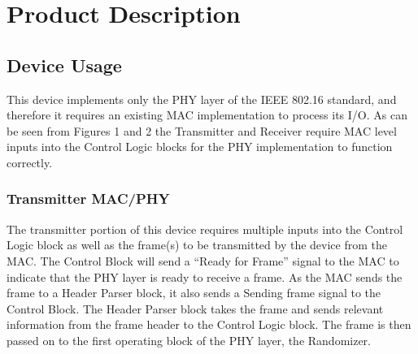 \documentclass[10pt]{article}
\begin{document}

\section{Product Description}
	\subsection{Device Usage}
	This device implements only the PHY layer of the IEEE 802.16 standard, and
	therefore it requires an existing MAC implementation to process its I/O. As can
	be seen from Figures 1 and 2 %
	the Transmitter and Receiver require MAC level inputs into the Control Logic
	blocks for the PHY implementation to function correctly.

	\subsubsection{Transmitter MAC/PHY}
	The transmitter portion of this device requires multiple inputs into the
	Control Logic block as well as the frame(s) to be transmitted by the device
	from the MAC.  The Control Block will send a “Ready for Frame” signal to the
	MAC to indicate that the PHY layer is ready to receive a frame. As the MAC
	sends the frame to a Header Parser block, it also sends a Sending frame signal
	to the Control Block. The Header Parser block takes the frame and sends
	relevant information from the frame header to the Control Logic block. The
	frame is then passed on to the first operating block of the PHY layer, the
	Randomizer.
\end{document}
